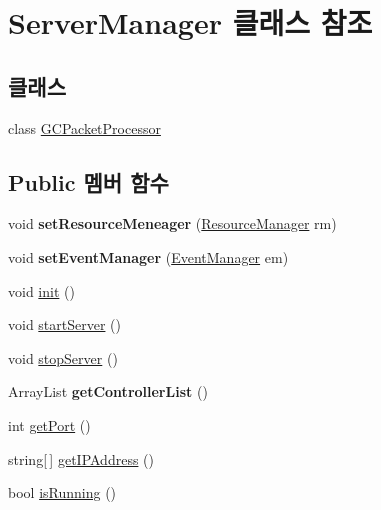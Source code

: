 \hypertarget{class_server_manager}{}\section{Server\+Manager 클래스 참조}
\label{class_server_manager}
\subsection*{클래스}
\begin{DoxyCompactItemize}
\item 
class \hyperlink{class_server_manager_1_1_g_c_packet_processor}{G\+C\+Packet\+Processor}
\end{DoxyCompactItemize}
\subsection*{Public 멤버 함수}
\begin{DoxyCompactItemize}
\item 
\hypertarget{class_server_manager_ab02465d0708b65f377a76a6a2f56cc2a}{}void {\bfseries set\+Resource\+Meneager} (\hyperlink{class_resource_manager}{Resource\+Manager} rm)\label{class_server_manager_ab02465d0708b65f377a76a6a2f56cc2a}

\item 
\hypertarget{class_server_manager_aa3958ad086f969c79af74c911db3a117}{}void {\bfseries set\+Event\+Manager} (\hyperlink{class_event_manager}{Event\+Manager} em)\label{class_server_manager_aa3958ad086f969c79af74c911db3a117}

\item 
void \hyperlink{class_server_manager_a9f1c5daccfe1743857d149ea8440cdbf}{init} ()
\item 
void \hyperlink{class_server_manager_ad753c79f3f2e4ade1d4cf6cd239bc949}{start\+Server} ()
\item 
void \hyperlink{class_server_manager_a88ea7e510fc57e2966d4b88f6fc4da8c}{stop\+Server} ()
\item 
\hypertarget{class_server_manager_aae062674cf602cd09876dfe6f6837915}{}Array\+List {\bfseries get\+Controller\+List} ()\label{class_server_manager_aae062674cf602cd09876dfe6f6837915}

\item 
int \hyperlink{class_server_manager_a887b75d30b5212341e86d2b18e5b1120}{get\+Port} ()
\item 
string\mbox{[}$\,$\mbox{]} \hyperlink{class_server_manager_a71b2a5361c711b1974ee60e4ed60ceb0}{get\+I\+P\+Address} ()
\item 
bool \hyperlink{class_server_manager_a09dbc4ef521584f7e4b7aa0a139a19df}{is\+Running} ()
\end{DoxyCompactItemize}


